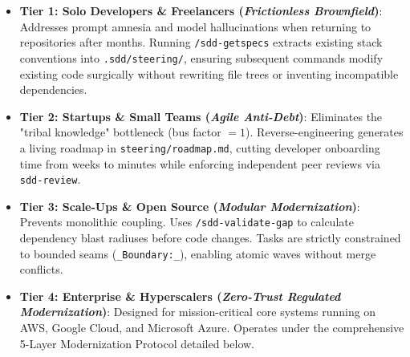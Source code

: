 \documentclass[11pt,a4paper]{article}
\begin{document}
\begin{itemize}
    \item \textbf{Tier 1: Solo Developers \& Freelancers (\textit{Frictionless Brownfield})}: Addresses prompt amnesia and model hallucinations when returning to repositories after months. Running \texttt{/sdd-getspecs} extracts existing stack conventions into \texttt{.sdd/steering/}, ensuring subsequent commands modify existing code surgically without rewriting file trees or inventing incompatible dependencies.
    \item \textbf{Tier 2: Startups \& Small Teams (\textit{Agile Anti-Debt})}: Eliminates the "tribal knowledge" bottleneck (bus factor $= 1$). Reverse-engineering generates a living roadmap in \texttt{steering/roadmap.md}, cutting developer onboarding time from weeks to minutes while enforcing independent peer reviews via \texttt{sdd-review}.
    \item \textbf{Tier 3: Scale-Ups \& Open Source (\textit{Modular Modernization})}: Prevents monolithic coupling. Uses \texttt{/sdd-validate-gap} to calculate dependency blast radiuses before code changes. Tasks are strictly constrained to bounded seams (\texttt{\_Boundary:\_}), enabling atomic waves without merge conflicts.
    \item \textbf{Tier 4: Enterprise \& Hyperscalers (\textit{Zero-Trust Regulated Modernization})}: Designed for mission-critical core systems running on AWS, Google Cloud, and Microsoft Azure. Operates under the comprehensive 5-Layer Modernization Protocol detailed below.
\end{itemize}
\end{document}
